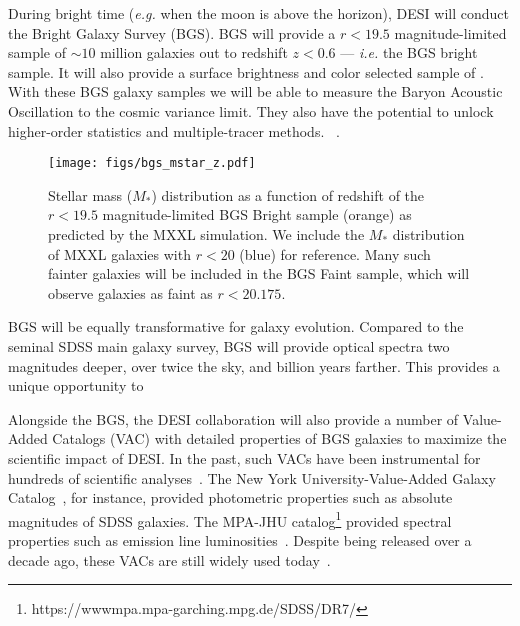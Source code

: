 During bright time (\emph{e.g.} when the moon is above the horizon), DESI will
conduct the Bright Galaxy Survey (BGS). 
BGS will provide a $r < 19.5$ magnitude-limited sample of ${\sim}10$ million
galaxies out to redshift $z < 0.6$ --- \emph{i.e.} the BGS bright sample. 
It will also provide a surface brightness and color selected sample of 
. 
With these BGS galaxy samples we will be able to measure the Baryon Acoustic
Oscillation to the cosmic variance limit. 
They also have the potential to unlock higher-order statistics and
multiple-tracer methods. 
~\citep{desicollaboration2016,
desicollaboration2016a}.


\begin{figure}
\begin{center}
    \texttt{[image: figs/bgs\_mstar\_z.pdf]}
    \caption{
        Stellar mass ($M_*$) distribution as a function of redshift of the $r < 19.5$
        magnitude-limited BGS Bright sample (orange) as predicted by the MXXL
        simulation. 
        We include the $M_*$ distribution of MXXL galaxies with $r < 20$ (blue)
        for reference.
        Many such fainter galaxies will be included in the BGS Faint sample,
        which will observe galaxies as faint as $r < 20.175$. 
    } \label{fig:bgs_mstar}
\end{center}
\end{figure}

BGS will be equally transformative for galaxy evolution. 
Compared to the seminal SDSS main galaxy survey, BGS will provide optical
spectra two magnitudes deeper, over twice the sky, and  billion years
farther. 
This provides a unique opportunity to 

Alongside the BGS, the DESI collaboration will also provide a number of
Value-Added Catalogs (VAC) with detailed properties of BGS galaxies to maximize
the scientific impact of DESI. 
In the past, such VACs have been instrumental for hundreds of scientific
analyses~\citep[see][for a review]{blanton2009}. 
The New York University-Value-Added Galaxy
Catalog~\citep[NYU-VAGC][]{blanton2005}, for instance, provided photometric
properties such as absolute magnitudes of SDSS galaxies. 
The MPA-JHU catalog\footnote{https://wwwmpa.mpa-garching.mpg.de/SDSS/DR7/}
provided spectral properties such as emission line
luminosities~\cite{brinchmann2004}.
Despite being released over a decade ago, these VACs are still widely used
today~\citep[\emph{e.g.}][]{alpaslan2021}. 

